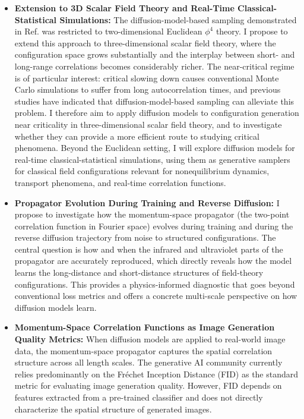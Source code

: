 \documentclass[11pt,a4paper]{article}
\begin{document}
\begin{itemize}
    \item \textbf{Extension to 3D Scalar Field Theory and Real-Time Classical-Statistical Simulations:}
The diffusion-model-based sampling demonstrated in Ref.\cite{Wang:2023exq} was restricted to two-dimensional Euclidean $\phi^4$ theory. I propose to extend this approach to three-dimensional scalar field theory,
where the configuration space grows substantially and the interplay between short- and long-range
correlations becomes considerably richer. The near-critical regime is of particular interest: critical slowing down causes conventional Monte Carlo simulations to suffer from long autocorrelation times, and previous studies have indicated that diffusion-model-based sampling can alleviate this problem\cite{Wang:2023exq}. I therefore aim to apply diffusion models to configuration generation near criticality in three-dimensional scalar field theory, and to investigate whether they can provide a more efficient route to studying critical phenomena. Beyond the Euclidean setting, I will explore diffusion models for real-time classical-statistical simulations, using them as generative samplers for classical field configurations relevant for nonequilibrium dynamics, transport phenomena, and real-time correlation functions.

    \item \textbf{Propagator Evolution During Training and Reverse Diffusion:}
    I propose to investigate how the momentum-space propagator (the two-point correlation function in Fourier space) evolves during training and during the reverse diffusion trajectory from noise to structured configurations. The central question is how and when the infrared and ultraviolet parts of the propagator are accurately reproduced, which directly reveals how the model learns the long-distance and short-distance structures of field-theory configurations. This provides a physics-informed diagnostic that goes beyond conventional loss metrics and offers a concrete multi-scale perspective on how diffusion models learn.

    \item \textbf{Momentum-Space Correlation Functions as Image Generation Quality Metrics:}
    When diffusion models are applied to real-world image data, the momentum-space propagator captures the spatial correlation structure across all length scales. The generative AI community currently relies predominantly on the Fr\'echet Inception Distance (FID)\cite{Heusel:2017FID} as the standard metric for evaluating image generation quality. However, FID depends on features extracted from a pre-trained classifier and does not directly characterize the spatial structure of generated images.


\end{itemize}
\end{document}
